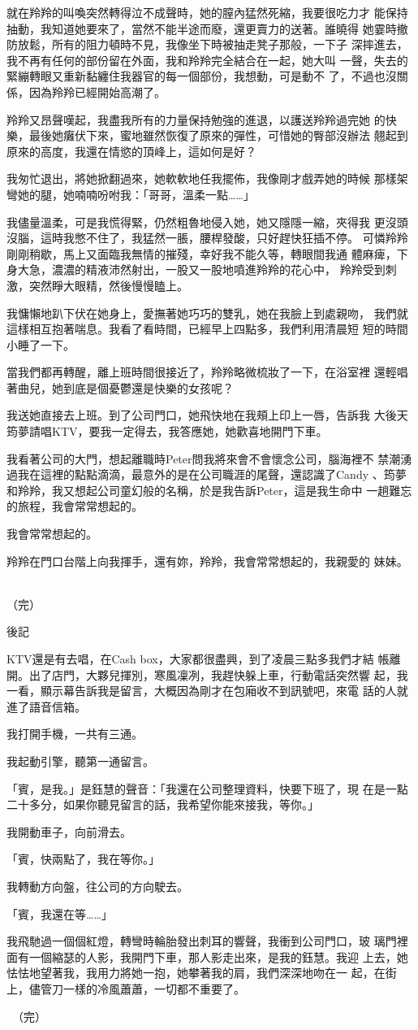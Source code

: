 就在羚羚的叫喚突然轉得泣不成聲時，她的膣內猛然死縮，我要很吃力才
能保持抽動，我知道她要來了，當然不能半途而廢，還更賣力的送著。誰曉得
她霎時撤防放鬆，所有的阻力頓時不見，我像坐下時被抽走凳子那般，一下子
深摔進去，我不再有任何的部份留在外面，我和羚羚完全結合在一起，她大叫
一聲，失去的緊繃轉眼又重新黏纏住我器官的每一個部份，我想動，可是動不
了，不過也沒關係，因為羚羚已經開始高潮了。

羚羚又昂聲嘆起，我盡我所有的力量保持勉強的進退，以護送羚羚過完她
的快樂，最後她癱伏下來，蜜地雖然恢復了原來的彈性，可惜她的臀部沒辦法
翹起到原來的高度，我還在情慾的頂峰上，這如何是好？

我匆忙退出，將她掀翻過來，她軟軟地任我擺佈，我像剛才戲弄她的時候
那樣架彎她的腿，她喃喃吩咐我：「哥哥，溫柔一點……」

我儘量溫柔，可是我慌得緊，仍然粗魯地侵入她，她又隱隱一縮，夾得我
更沒頭沒腦，這時我憋不住了，我猛然一脹，腰桿發酸，只好趕快狂插不停。
可憐羚羚剛剛稍歇，馬上又面臨我無情的摧殘，幸好我不能久等，轉眼間我通
體麻痺，下身大急，濃濃的精液沛然射出，一股又一股地噴進羚羚的花心中，
羚羚受到刺激，突然睜大眼精，然後慢慢瞌上。

我慵懶地趴下伏在她身上，愛撫著她巧巧的雙乳，她在我臉上到處親吻，
我們就這樣相互抱著喘息。我看了看時間，已經早上四點多，我們利用清晨短
短的時間小睡了一下。

當我們都再轉醒，離上班時間很接近了，羚羚略微梳妝了一下，在浴室裡
還輕唱著曲兒，她到底是個憂鬱還是快樂的女孩呢？

我送她直接去上班。到了公司門口，她飛快地在我頰上印上一唇，告訴我
大後天筠夢請唱KTV，要我一定得去，我答應她，她歡喜地開門下車。

我看著公司的大門，想起離職時Peter問我將來會不會懷念公司，腦海裡不
禁潮湧過我在這裡的點點滴滴，最意外的是在公司職涯的尾聲，還認識了Candy
、筠夢和羚羚，我又想起公司童幻般的名稱，於是我告訴Peter，這是我生命中
一趟難忘的旅程，我會常常想起的。

我會常常想起的。

羚羚在門口台階上向我揮手，還有妳，羚羚，我會常常想起的，我親愛的
妹妹。
　

（完）


後記


KTV還是有去唱，在Cash box，大家都很盡興，到了凌晨三點多我們才結
帳離開。出了店門，大夥兒揮別，寒風凜冽，我趕快躲上車，行動電話突然響
起，我一看，顯示幕告訴我是留言，大概因為剛才在包廂收不到訊號吧，來電
話的人就進了語音信箱。

我打開手機，一共有三通。

我起動引擎，聽第一通留言。

「賓，是我。」是鈺慧的聲音：「我還在公司整理資料，快要下班了，現
在是一點二十多分，如果你聽見留言的話，我希望你能來接我，等你。」

我開動車子，向前滑去。

「賓，快兩點了，我在等你。」

我轉動方向盤，往公司的方向駛去。

「賓，我還在等……」

我飛馳過一個個紅燈，轉彎時輪胎發出刺耳的響聲，我衝到公司門口，玻
璃門裡面有一個縮瑟的人影，我開門下車，那人影走出來，是我的鈺慧。我迎
上去，她怯怯地望著我，我用力將她一抱，她攀著我的肩，我們深深地吻在一
起，在街上，儘管刀一樣的冷風蕭蕭，一切都不重要了。　

　（完）











